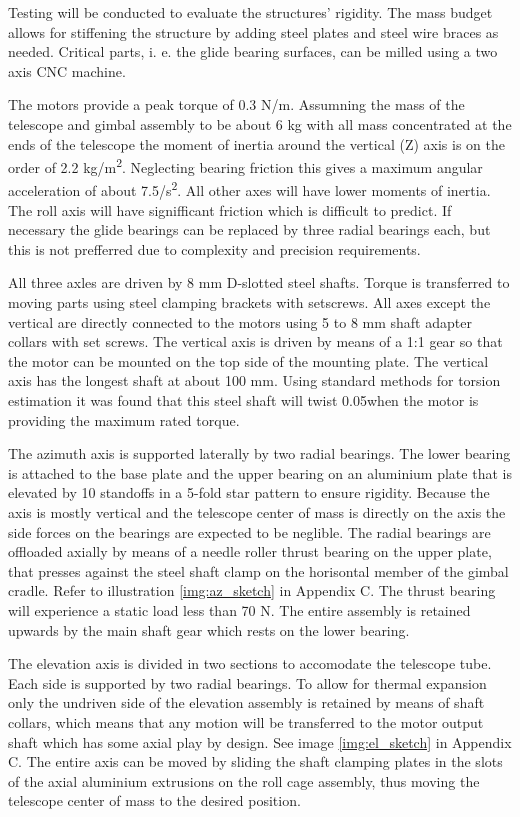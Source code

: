 Testing will be conducted to evaluate the structures' rigidity. The mass budget allows for stiffening the structure by adding steel plates and steel wire braces as needed. Critical parts, i. e. the glide bearing surfaces, can be milled using a two axis CNC machine. 

The motors provide a peak torque of 0.3 N/m. Assumning the mass of the telescope and gimbal assembly to be about 6 kg with all mass concentrated at the ends of the telescope the moment of inertia around the vertical (Z) axis is on the order of 2.2 kg/m\textsuperscript{2}. Neglecting bearing friction this gives a maximum angular acceleration of about 7.5\textdegree/s\textsuperscript{2}. All other axes will have lower moments of inertia. The roll axis will have signifficant friction which is difficult to predict. If necessary the glide bearings can be replaced by three radial bearings each, but this is not prefferred due to complexity and precision requirements. 

All three axles are driven by 8 mm D-slotted steel shafts. Torque is transferred to moving parts using steel clamping brackets with setscrews. All axes except the vertical are directly connected to the motors using 5 to 8 mm shaft adapter collars with set screws. The vertical axis is driven by means of a 1:1 gear so that the motor can be mounted on the top side of the mounting plate. The vertical axis has the longest shaft at about 100 mm. Using standard methods for torsion estimation it was found that this steel shaft will twist 0.05\textdegree when the motor is providing the maximum rated torque. 

The azimuth axis is supported laterally by two radial bearings. The lower bearing is attached to the base plate and the upper bearing on an aluminium plate that is elevated by 10 standoffs in a 5-fold star pattern to ensure rigidity. Because the axis is mostly vertical and the telescope center of mass is directly on the axis the side forces on the bearings are expected to be neglible. The radial bearings are offloaded axially by means of a needle roller thrust bearing on the upper plate, that presses against the steel shaft clamp on the horisontal member of the gimbal cradle. Refer to illustration \ref{img:az_sketch} in Appendix C. The thrust bearing will experience a static load less than 70 N. The entire assembly is retained upwards by the main shaft gear which rests on the lower bearing. 

The elevation axis is divided in two sections to accomodate the telescope tube. Each side is supported by two radial bearings. To allow for thermal expansion only the undriven side of the elevation assembly is retained by means of shaft collars, which means that any motion will be transferred to the motor output shaft which has some axial play by design. See image \ref{img:el_sketch} in Appendix C. The entire axis can be moved by sliding the shaft clamping plates in the slots of the axial aluminium extrusions on the roll cage assembly, thus moving the telescope center of mass to the desired position. 

